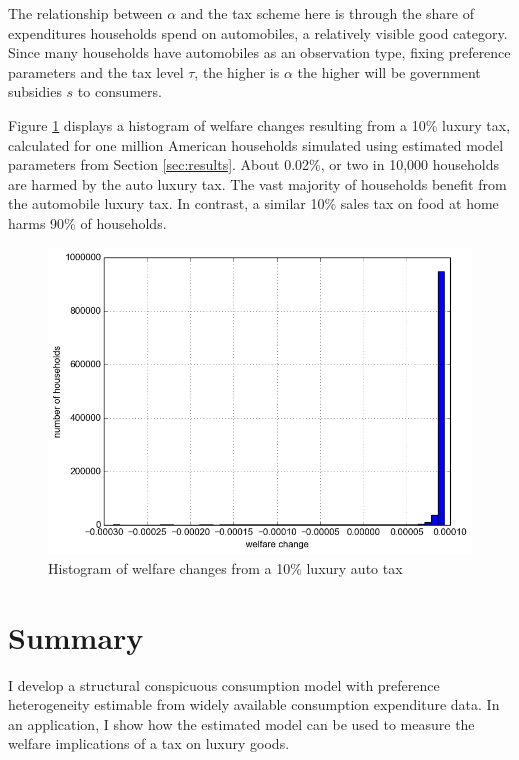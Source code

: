 \documentclass[12pt]{article}
\begin{document}
The relationship between $\alpha$ and the tax scheme here is through the share of expenditures households spend on automobiles, a relatively visible good category.  Since many households have automobiles as an observation type, fixing preference parameters and the tax level $\tau$, the higher is $\alpha$ the higher will be government subsidies $s$ to consumers.

Figure \ref{fig:wel_change_10} displays a histogram of welfare changes resulting from a 10\% luxury tax, calculated for one million American households simulated using estimated model parameters from Section \ref{sec:results}.  About 0.02\%, or two in 10,000 households are harmed by the auto luxury tax.  The vast majority of households benefit from the automobile luxury tax.  In contrast, a similar 10\% sales tax on food at home harms 90\% of households.

\begin{figure}
    \centering
	\includegraphics[scale=.6]{pics/tax_hist_Car10.png}
    \caption{Histogram of welfare changes from a 10\% luxury auto tax}
    \label{fig:wel_change_10}
\end{figure}

\section{Summary}
I develop a structural conspicuous consumption model with preference heterogeneity estimable from widely available consumption expenditure data.  In an application, I show how the estimated model can be used to measure the welfare implications of a tax on luxury goods.
\end{document}
